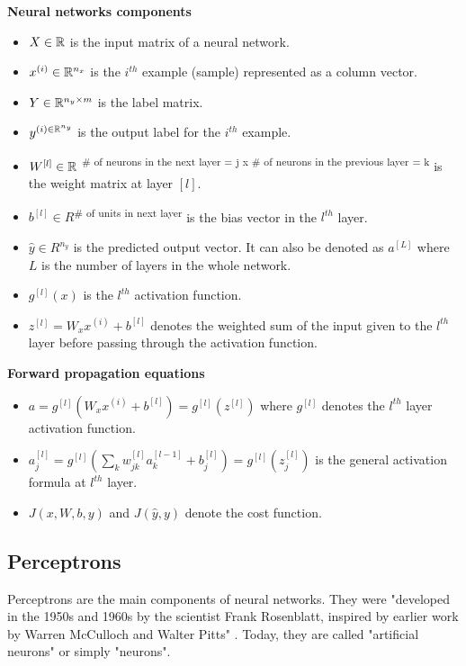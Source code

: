 \noindent \textbf{Neural networks components}
\begin{itemize}
\item $X\in \mathbb{R}$ is the input matrix of a neural network.
\item $x^{(i)} \in \mathbb{R}^{n_{x}}$ is the $i^{th}$ example (sample) represented as a column vector.
\item $Y \in \mathbb{R}^{n_{y} \times m}$ is the label matrix.
\item $y^{(i) \in \mathbb{R}^{n_{y}}}$ is the output label for the $i^{th}$ example.
\item $W^{[l]} \in \mathbb{R}$ \textsuperscript{\# of neurons in the next layer = j  x \# of neurons in the previous layer = k} is the weight matrix at layer $[l]$.
\item $b^{[l]} \in R$\textsuperscript{\# of units in next layer} is the bias vector in the $l^{th}$ layer.
\item $\hat{y} \in R^{n_{y}}$ is the predicted output vector. It can also be denoted as $a^{[L]}$ where $L$ is the number of layers in the whole network.
\item $g^{[l]}(x)$ is the $l^{th}$ activation function.  
\item $z^{[l]} = W_{x}x^{(i)} + b^{[l]}$ denotes the weighted sum of the input given to the $l^{th}$ layer before passing through the activation function.\\
\end{itemize}

\noindent \textbf{Forward propagation equations}
\begin{itemize}
\item $a = g^{[l]}(W_{x}x^{(i)} + b^{[l]}) = g^{[l]}(z^{[l]})$ where $g^{[l]}$ denotes the $l^{th}$ layer activation function.
\item $a_{j}^{[l]} = g^{[l]} (\sum_{k} w_{jk}^{[l]}a_{k}^{[l-1]} + b_{j}^{[l]}) = g^{[l]} (z_{j}^{[l]}) $ is the general activation formula at $l^{th}$ layer.
\item $J(x, W, b, y)$ and $J(\hat{y}, y)$ denote the cost function.
\end{itemize}

\subsection{Perceptrons}
\label{perceptron}
\setlength{\marginparwidth}{3cm}\leavevmode {}Perceptrons are the main components of neural networks. They were "developed in the 1950s and 1960s by the scientist Frank Rosenblatt, inspired by earlier work by Warren McCulloch and Walter Pitts" \cite{13}. Today, they are called "artificial neurons" or simply "neurons".

